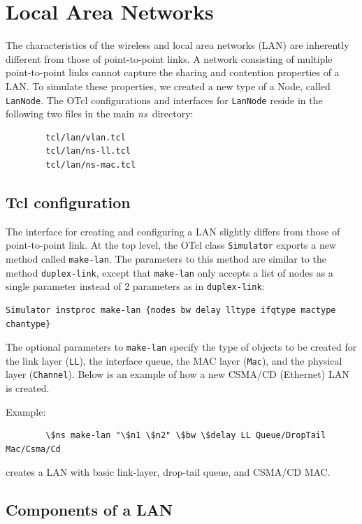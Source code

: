 

\chapter{Local Area Networks}
\label{chap:lan}

The characteristics of the wireless and local area networks (LAN) are
inherently different from those of point-to-point links.  A network
consisting of multiple point-to-point links cannot capture the sharing
and contention properties of a LAN.  To simulate these properties, we
created a new type of a Node, called {\tt LanNode}.  The OTcl
configurations and interfaces for {\tt LanNode} reside in the following
two files in the main \emph{ns}\ directory:

\begin{verbatim}
        tcl/lan/vlan.tcl
        tcl/lan/ns-ll.tcl
        tcl/lan/ns-mac.tcl
\end{verbatim}

\section{Tcl configuration}
\label{sec:lan_tcl}

The interface for creating and configuring a LAN slightly differs from
those of point-to-point link.  At the top level, the OTcl class
{\tt Simulator} exports a new method called {\tt make-lan}.  The
parameters to this method are similar to the method {\tt duplex-link},
except that {\tt make-lan} only accepts a list of nodes as a single
parameter instead of 2 parameters as in {\tt duplex-link}:

\begin{verbatim}
Simulator instproc make-lan {nodes bw delay lltype ifqtype mactype chantype}
\end{verbatim}

The optional parameters to {\tt make-lan} specify the type of objects
to be created for the link layer ({\tt LL}), the interface queue, the
MAC layer ({\tt Mac}), and the physical layer ({\tt Channel}).  Below
is an example of how a new CSMA/CD (Ethernet) LAN is created.

Example:
\begin{verbatim}
        \$ns make-lan "\$n1 \$n2" \$bw \$delay LL Queue/DropTail Mac/Csma/Cd
\end{verbatim}
creates a LAN with basic link-layer, drop-tail queue, and CSMA/CD MAC.


\section{Components of a LAN}
\label{sec:lan_components}


